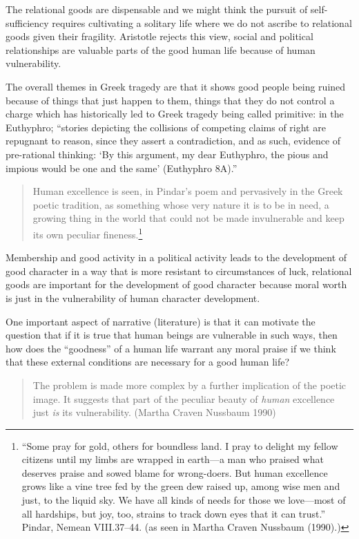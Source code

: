 \documentclass[12pt]{book}
\theoremstyle{definition}
\theoremstyle{remark}
\begin{document}
The relational goods are dispensable and we might think the pursuit of self-sufficiency requires cultivating a solitary life where we do not ascribe to relational goods given their fragility. Aristotle rejects this view, social and political relationships are valuable parts of the good human life because of human vulnerability.

The overall themes in Greek tragedy are that it shows good people being ruined because of things that just happen to them, things that they do not control a charge which has historically led to Greek tragedy being called primitive: in the Euthyphro; ``stories depicting the collisions of competing claims of right are repugnant to reason, since they assert a contradiction, and as such, evidence of pre-rational thinking: `By this argument, my dear Euthyphro, the pious and impious would be one and the same' (Euthyphro 8A).''

\begin{quote}
Human excellence is seen, in Pindar's poem and pervasively in the Greek poetic tradition, as something whose very nature it is to be in need, a growing thing in the world that could not be made invulnerable and keep its own peculiar fineness.\footnote{``Some pray for gold, others for boundless land. I pray to delight my fellow citizens until my limbs are wrapped in earth---a man who praised what deserves praise and sowed blame for wrong-doers. But human excellence grows like a vine tree fed by the green dew raised up, among wise men and just, to the liquid sky. We have all kinds of needs for those we love---most of all hardships, but joy, too, strains to track down eyes that it can trust.'' Pindar, Nemean VIII.37--44. (as seen in Martha Craven Nussbaum (1990).)}
\end{quote}

Membership and good activity in a political activity leads to the development of good character in a way that is more resistant to circumstances of luck, relational goods are important for the development of good character because moral worth is just in the vulnerability of human character development.

One important aspect of narrative (literature) is that it can motivate the question that if it is true that human beings are vulnerable in such ways, then how does the ``goodness'' of a human life warrant any moral praise if we think that these external conditions are necessary for a good human life?

\begin{quote}
The problem is made more complex by a further implication of the poetic image. It suggests that part of the peculiar beauty of \emph{human} excellence just \emph{is} its vulnerability. (Martha Craven Nussbaum 1990)
\end{quote}
\end{document}
